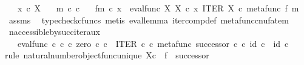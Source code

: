 \begin{isabellebody}
\ \ \ {\isachardoublequoteopen}x\ {\isasymin}\isactrlsub c\ X{\isachardoublequoteclose}\isanewline
\ \ \ {\isachardoublequoteopen}m\ {\isasymin}\isactrlsub c\ {\isasymnat}\isactrlsub c{\isachardoublequoteclose}\isanewline
\ \ \ {\isachardoublequoteopen}{\isacharparenleft}{\kern0pt}f\isactrlbsup {\isasymcirc}m\isactrlesup {\isacharparenright}{\kern0pt}\ {\isasymcirc}\isactrlsub c\ x\ {\isacharequal}{\kern0pt}\ eval{\isacharunderscore}{\kern0pt}func\ X\ X\ {\isasymcirc}\isactrlsub c\ {\isasymlangle}x\ {\isacharcomma}{\kern0pt}ITER\ X\ {\isasymcirc}\isactrlsub c\ {\isasymlangle}metafunc\ f\ {\isacharcomma}{\kern0pt}m{\isasymrangle}{\isasymrangle}{\isachardoublequoteclose}\isanewline
%
\isadelimproof
\ \ %
\endisadelimproof
%
\isatagproof
{}\isamarkupfalse%
\ assms\ \isamarkupfalse%
\ {\isacharparenleft}{\kern0pt}typecheck{\isacharunderscore}{\kern0pt}cfuncs{\isacharcomma}{\kern0pt}\ metis\ eval{\isacharunderscore}{\kern0pt}lemma\ iter{\isacharunderscore}{\kern0pt}comp{\isacharunderscore}{\kern0pt}def{}\ metafunc{\isacharunderscore}{\kern0pt}cnufatem{\isacharparenright}{\kern0pt}%
\endisatagproof
{\isafoldproof}%
%
\isadelimproof
\isanewline
%
\endisadelimproof
\isanewline
{}\isamarkupfalse%
\ n{\isacharunderscore}{\kern0pt}accessible{\isacharunderscore}{\kern0pt}by{\isacharunderscore}{\kern0pt}succ{\isacharunderscore}{\kern0pt}iter{\isacharunderscore}{\kern0pt}aux{\isacharcolon}{\kern0pt}\isanewline
\ \ \ {\isachardoublequoteopen}eval{\isacharunderscore}{\kern0pt}func\ {\isasymnat}\isactrlsub c\ {\isasymnat}\isactrlsub c\ {\isasymcirc}\isactrlsub c\ {\isasymlangle}zero\ {\isasymcirc}\isactrlsub c\ {\isasymbeta}\isactrlbsub {\isasymnat}\isactrlsub c\isactrlesub {\isacharcomma}{\kern0pt}\ \ ITER\ {\isasymnat}\isactrlsub c\ {\isasymcirc}\isactrlsub c\ {\isasymlangle}{\isacharparenleft}{\kern0pt}metafunc\ successor{\isacharparenright}{\kern0pt}\ {\isasymcirc}\isactrlsub c\ {\isasymbeta}\isactrlbsub {\isasymnat}\isactrlsub c\isactrlesub \ {\isacharcomma}{\kern0pt}id\ {\isasymnat}\isactrlsub c{\isasymrangle}{\isasymrangle}\ {\isacharequal}{\kern0pt}\ id\ {\isasymnat}\isactrlsub c{\isachardoublequoteclose}\isanewline
%
\isadelimproof
%
\endisadelimproof
%
\isatagproof
{}\isamarkupfalse%
{\isacharparenleft}{\kern0pt}rule\ natural{\isacharunderscore}{\kern0pt}number{\isacharunderscore}{\kern0pt}object{\isacharunderscore}{\kern0pt}func{\isacharunderscore}{\kern0pt}unique{\isacharbrackleft}{\kern0pt}\ X{\isacharequal}{\kern0pt}{\isachardoublequoteopen}{\isasymnat}\isactrlsub c{\isachardoublequoteclose}{\isacharcomma}{\kern0pt}\ \ f\ {\isacharequal}{\kern0pt}\ successor{\isacharbrackright}{\kern0pt}{\isacharparenright}{\kern0pt}\isanewline

\end{isabellebody}
